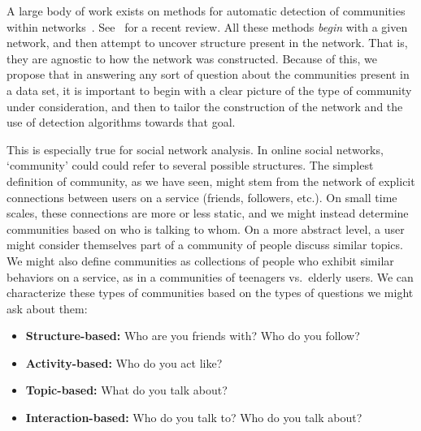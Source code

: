 \documentclass[letterpaper]{article}
\begin{document}


A large body of work exists on methods for automatic detection of communities within networks~\cite{newman2004fast,newman2004finding,rosvall2008maps, blondel2008fast,LancichinettiPlos}. See~\cite{fortunato2010community} for a recent review. All these methods \emph{begin} with a given network, and then attempt to uncover structure present in the network. That is, they are agnostic to how the network was constructed. Because of this, we propose that in answering any sort of question about the communities present in a data set, it is important to begin with a clear picture of the type of community under consideration, and then to tailor the construction of the network and the use of detection algorithms towards that goal.

This is especially true for social network analysis. In online social networks, `community' could could refer to several possible structures. The simplest definition of community, as we have seen, might stem from the network of explicit connections between users on a service (friends, followers, etc.). On small time scales, these connections are more or less static, and we might instead determine communities based on who is talking to whom. On a more abstract level, a user might consider themselves part of a community of people discuss similar topics. We might also define communities as collections of people who exhibit similar behaviors on a service, as in a communities of teenagers vs.\ elderly users. We can characterize these types of communities based on the types of questions we might ask about them:
\begin{itemize}
	\item \textbf{Structure-based:} Who are you friends with? Who do you follow?
	\item \textbf{Activity-based:} Who do you act like?
	\item \textbf{Topic-based:} What do you talk about?
	\item \textbf{Interaction-based:} Who do you talk to? Who do you talk about?
\end{itemize}
\end{document}

